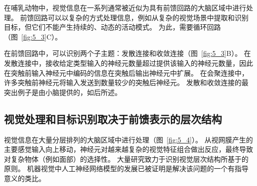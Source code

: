 在哺乳动物中，视觉信息在一系列通常被近似为具有前馈回路的大脑区域中进行处理。
前馈回路可以以复杂的方式处理信息，例如从复杂的视觉场景中提取和识别目标，但它们不能产生持续的、动态的活动模式。
为此，需要循环回路（图~\ref{fig:5_3}C）。


在前馈回路中，可以识别两个子主题：发散连接和收敛连接（图~\ref{fig:5_3}B）。 
在发散连接中，接收给定类型输入的神经元数量超过提供该输入的神经元数量，因此在突触前输入神经元中编码的信息在突触后输出神经元中扩展。
在会聚连接中，许多突触前神经元将输入发送到数量较少的突触后神经元。
发散和收敛连接的最突出例子是由小脑提供的，如后所述。



\subsection{视觉处理和目标识别取决于前馈表示的层次结构}

视觉信息在大量分层排列的大脑区域中进行处理（图~\ref{fig:5_4}）。
从视网膜产生的主要感觉输入向上移动，神经元对越来越复杂的视觉特征组合做出反应，最终导致对复杂物体（例如面部）的选择性。
大量研究致力于识别视觉层次结构所基于的原则。
机器视觉中人工神经网络模型的发展已被证明是解决该问题的一个有指导意义的类比。


